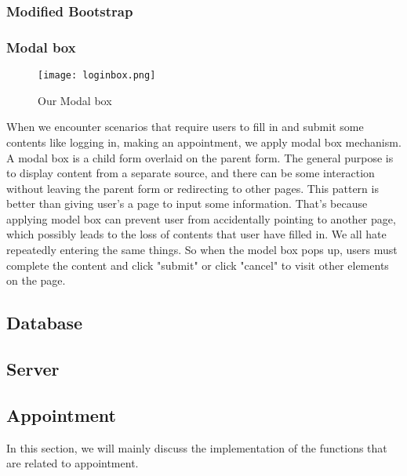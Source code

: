 \documentclass[a4paper]{article}
\begin{document}
\subsubsection{Modified Bootstrap}
\subsubsection{Modal box}
      \begin{figure}[h]
         \centering
         \texttt{[image: loginbox.png]}
         \caption{Our Modal box}
         \label{navibar}
     \end{figure}
When we encounter scenarios that require users to fill in and submit some contents like logging in, making an appointment, we apply modal box mechanism. A modal box is a child form overlaid on the parent form. The general purpose is to display content from a separate source, and there can be some interaction without leaving the parent form or redirecting to other pages. This pattern is better than giving user's a page to input some information. That's because applying model box can prevent user from accidentally pointing to another page, which possibly leads to the loss of contents that user have filled in. We all hate repeatedly entering the same things. So when the model box pops up, users must complete the content and click "submit" or click "cancel" to visit other elements on the page.

\subsection{Database}
\subsection{Server}
\subsection{Appointment}
In this section, we will mainly discuss the implementation of the functions that are related to appointment.
\end{document}
